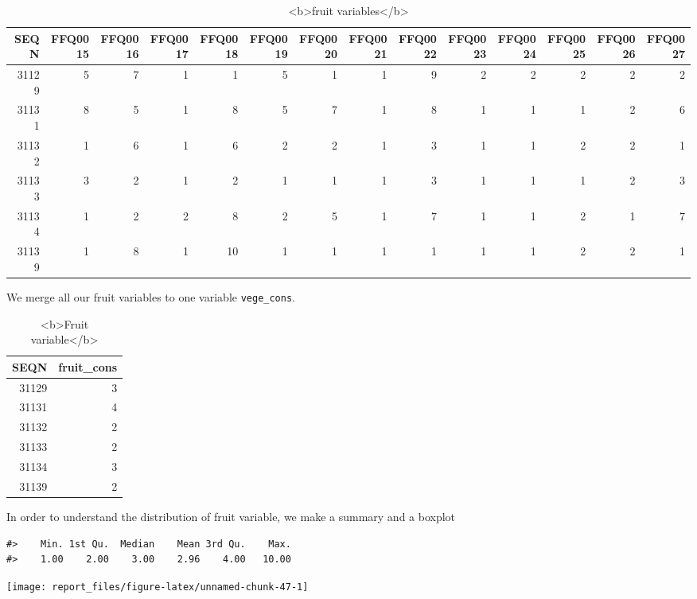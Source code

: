 \documentclass[
]{article}
\begin{document}
\begin{table}

\caption{\label{tab:unnamed-chunk-45}<b>fruit variables</b>}
\centering
\begin{tabular}[t]{r|r|r|r|r|r|r|r|r|r|r|r|r|r}
\hline
SEQN & FFQ0015 & FFQ0016 & FFQ0017 & FFQ0018 & FFQ0019 & FFQ0020 & FFQ0021 & FFQ0022 & FFQ0023 & FFQ0024 & FFQ0025 & FFQ0026 & FFQ0027\\
\hline
31129 & 5 & 7 & 1 & 1 & 5 & 1 & 1 & 9 & 2 & 2 & 2 & 2 & 2\\
\hline
31131 & 8 & 5 & 1 & 8 & 5 & 7 & 1 & 8 & 1 & 1 & 1 & 2 & 6\\
\hline
31132 & 1 & 6 & 1 & 6 & 2 & 2 & 1 & 3 & 1 & 1 & 2 & 2 & 1\\
\hline
31133 & 3 & 2 & 1 & 2 & 1 & 1 & 1 & 3 & 1 & 1 & 1 & 2 & 3\\
\hline
31134 & 1 & 2 & 2 & 8 & 2 & 5 & 1 & 7 & 1 & 1 & 2 & 1 & 7\\
\hline
31139 & 1 & 8 & 1 & 10 & 1 & 1 & 1 & 1 & 1 & 1 & 2 & 2 & 1\\
\hline
\end{tabular}
\end{table}

We merge all our fruit variables to one variable \texttt{vege\_cons}.

\begin{table}

\caption{\label{tab:unnamed-chunk-46}<b>Fruit variable</b>}
\centering
\begin{tabular}[t]{r|r}
\hline
SEQN & fruit\_cons\\
\hline
31129 & 3\\
\hline
31131 & 4\\
\hline
31132 & 2\\
\hline
31133 & 2\\
\hline
31134 & 3\\
\hline
31139 & 2\\
\hline
\end{tabular}
\end{table}

In order to understand the distribution of fruit variable, we make a
summary and a boxplot

\begin{verbatim}
#>    Min. 1st Qu.  Median    Mean 3rd Qu.    Max. 
#>    1.00    2.00    3.00    2.96    4.00   10.00
\end{verbatim}

\begin{center}\texttt{[image: report\_files/figure-latex/unnamed-chunk-47-1]} \end{center}
\end{document}
